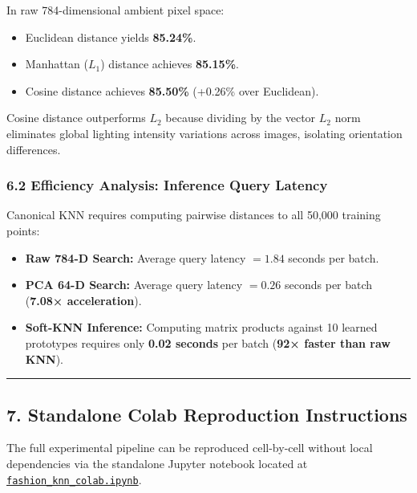 In raw 784-dimensional ambient pixel space:

\begin{itemize}
\tightlist
\item
  Euclidean distance yields \textbf{85.24\%}.
\item
  Manhattan (\(L_1\)) distance achieves \textbf{85.15\%}.
\item
  Cosine distance achieves \textbf{85.50\%} (+0.26\% over Euclidean).
\end{itemize}

Cosine distance outperforms \(L_2\) because dividing by the vector
\(L_2\) norm eliminates global lighting intensity variations across
images, isolating orientation differences.

\subsubsection{6.2 Efficiency Analysis: Inference Query
Latency}\label{62-efficiency-analysis-inference-query-latency}

Canonical KNN requires computing pairwise distances to all 50,000
training points:

\begin{itemize}
\tightlist
\item
  \textbf{Raw 784-D Search:} Average query latency \(= 1.84\) seconds
  per batch.
\item
  \textbf{PCA 64-D Search:} Average query latency \(= 0.26\) seconds per
  batch (\textbf{7.08× acceleration}).
\item
  \textbf{Soft-KNN Inference:} Computing matrix products against 10
  learned prototypes requires only \textbf{0.02 seconds} per batch
  (\textbf{92× faster than raw KNN}).
\end{itemize}

\begin{center}\rule{0.5\linewidth}{0.5pt}\end{center}

\subsection{7. Standalone Colab Reproduction
Instructions}\label{7-standalone-colab-reproduction-instructions}

The full experimental pipeline can be reproduced cell-by-cell without
local dependencies via the standalone Jupyter notebook located at
\href{fashion_knn_colab.ipynb}{\texttt{fashion\_knn\_colab.ipynb}}.

